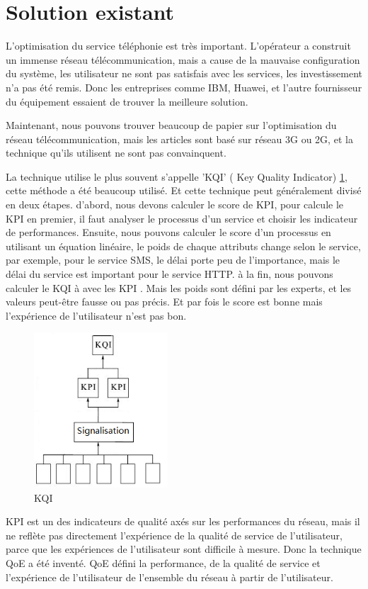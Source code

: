 \section{Solution existant}     
L'optimisation du service téléphonie est très important. L'opérateur a construit un immense réseau télécommunication, mais a cause de la mauvaise configuration du système, les utilisateur ne sont pas satisfais avec les services, les investissement n'a pas été remis. Donc les entreprises comme IBM, Huawei, et l'autre fournisseur du équipement essaient de trouver la meilleure solution. 

Maintenant, nous pouvons trouver beaucoup de papier sur l'optimisation du réseau télécommunication, mais les articles sont basé sur réseau 3G ou 2G, et la technique qu'ils utilisent ne sont pas convainquent. 

La technique utilise le plus souvent s'appelle 'KQI' ( Key Quality Indicator) \ref{fig:kqi}, cette méthode a été beaucoup utilisé. Et cette technique peut généralement divisé en deux étapes. d'abord, nous devons calculer le score de KPI, pour calcule le KPI en premier, il faut analyser le processus d'un service et choisir les indicateur de performances. Ensuite, nous pouvons calculer le score d'un processus en utilisant un équation linéaire, le poids de chaque attributs change selon le service, par exemple, pour le service SMS, le délai porte peu de l'importance, mais le délai du service est important pour le service HTTP. \textsf{à} la fin, nous pouvons calculer le KQI à avec les KPI \cite{kqi}. Mais les poids sont défini par les experts, et les valeurs peut-être fausse ou pas précis. Et par fois le score est bonne mais l'expérience de l'utilisateur n'est pas bon.
\begin{figure}[H]
\centering
\includegraphics[width=5cm]{images/kqi}
\caption{KQI}
\label{fig:kqi}
\end{figure}

KPI est un des indicateurs de qualité axés sur les performances du réseau, mais il ne reflète pas directement l'expérience de la qualité de service de l'utilisateur, parce que les expériences de l'utilisateur sont difficile à mesure. Donc la technique QoE a été inventé. QoE défini la performance, de la qualité de service et l'expérience de l'utilisateur de l'ensemble du réseau à partir de l'utilisateur.

